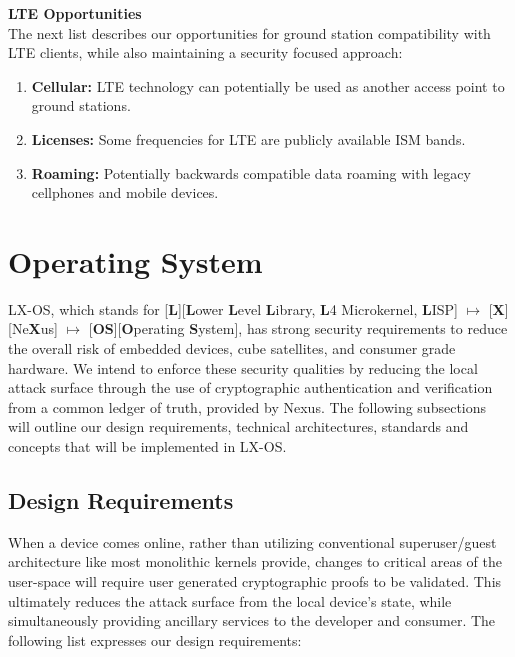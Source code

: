 \documentclass[11pt]{article}
\begin{document}
{\noindent\textbf{LTE Opportunities}} \\ 

\noindent The next list describes our opportunities for ground station compatibility with LTE clients, while also maintaining a security focused approach:

\begin{enumerate}
    \item \textbf{Cellular:} LTE technology can potentially be used as another access point to ground stations.
    \item \textbf{Licenses:} Some frequencies for LTE are publicly available ISM bands.
    \item \textbf{Roaming:} Potentially backwards compatible data roaming with legacy cellphones and mobile devices.
\end{enumerate}




\section{Operating System}
\label{LX-OS}

LX-OS, which stands for [\textbf{L}][\textbf{L}ower \textbf{L}evel \textbf{L}ibrary, \textbf{L}4 Microkernel, \textbf{L}ISP] $\longmapsto$ [\textbf{X}][Ne\textbf{X}us] $\longmapsto$ [\textbf{OS}][\textbf{O}perating \textbf{S}ystem], has strong security requirements to reduce the overall risk of embedded devices, cube satellites, and consumer grade hardware.
We intend to enforce these security qualities by reducing the local attack surface through the use of cryptographic authentication and verification from a common ledger of truth, provided by Nexus.
The following subsections will outline our design requirements, technical architectures, standards and concepts that will be implemented in LX-OS.



\subsection{Design Requirements}

When a device comes online, rather than utilizing conventional superuser/guest architecture like most monolithic kernels provide, changes to critical areas of the user-space will require user generated cryptographic proofs to be validated.
This ultimately reduces the attack surface from the local device's state, while simultaneously providing ancillary services to the developer and consumer.
The following list expresses our design requirements:
\end{document}
